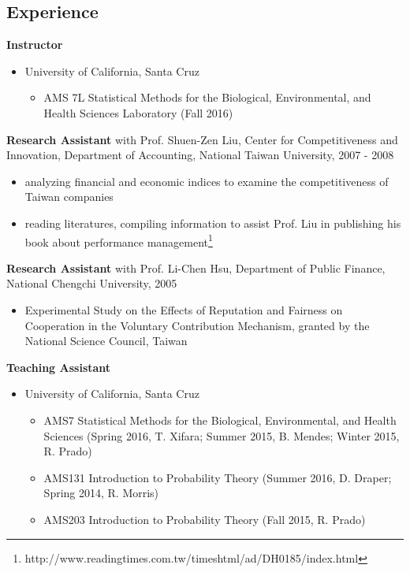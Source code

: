 \documentclass[]{res}
\begin{document}
\begin{resume}
\section{Experience}
 {\bf Instructor}
 \begin{itemize} \itemsep -2pt  %
 	\item University of California, Santa Cruz \hfill 
 	\begin{itemize} \itemsep -2pt 
 		\item AMS 7L Statistical Methods for the Biological, Environmental, and Health Sciences Laboratory (Fall 2016)
 	\end{itemize}
 \end{itemize}
   \vspace{-0.3cm} 
 {\bf Research Assistant} with Prof. Shuen-Zen Liu, Center for Competitiveness and Innovation, Department of Accounting, National Taiwan University, 2007 - 2008
 \begin{itemize} 
 \item analyzing financial and economic indices to examine the competitiveness of Taiwan companies
 \item reading literatures, compiling information to assist Prof. Liu in publishing his book about performance management\footnote{http://www.readingtimes.com.tw/timeshtml/ad/DH0185/index.html} 
 \end{itemize}
 {\bf Research Assistant} with Prof. Li-Chen Hsu, Department of Public Finance, National Chengchi University, 2005
 \begin{itemize}
 \item Experimental Study on the Effects of Reputation and Fairness on Cooperation in the Voluntary Contribution Mechanism, granted by the National Science Council, Taiwan
 \end{itemize}
 {\bf Teaching Assistant}
 \begin{itemize} \itemsep -2pt  %
 \item University of California, Santa Cruz \hfill
  	\begin{itemize}\itemsep -2pt 
 	\item AMS7 Statistical Methods for the Biological, Environmental, and Health Sciences (Spring 2016, T. Xifara; Summer 2015, B. Mendes; Winter 2015, R. Prado)
 	\item AMS131 Introduction to Probability Theory (Summer 2016, D. Draper; Spring 2014, R. Morris)
 	\item AMS203 Introduction to Probability Theory (Fall 2015, R. Prado)

\end{itemize}
\end{itemize}
\end{resume}
\end{document}
